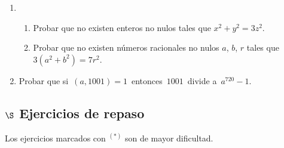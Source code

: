 \documentclass[a4paper,12pt,twoside,spanish,reqno]{amsbook}
\numberwithin{equation}{section}
\begin{document}
\begin{enumerate}
\item \begin{enumerate}
\item Probar que no existen enteros no nulos tales que $x^2 + y^2 = 3z^2$.
\item Probar que no existen n\'umeros racionales no nulos $a$, $b$, $r$ tales que $3(a^2 + b^2) = 7r^2$.
\end{enumerate}



%

%
\item Probar que si \,$(a,1001)=1$\, entonces \,$1001$\, divide a \,$a^{720}-1$.
\end{enumerate}



\subsection*{$\S$ Ejercicios de repaso} Los ejercicios marcados con ${}^{(*)}$ son de mayor dificultad.
\end{document}
